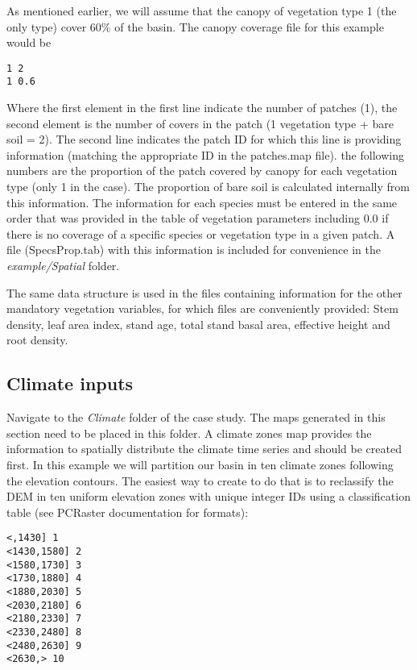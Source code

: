 As mentioned earlier, we will assume that the canopy of vegetation type 1 (the only type) cover 60\% of the basin. The canopy coverage file for this example would be

\begin{verbatim}
1 2
1 0.6
\end{verbatim}

Where the first element in the first line indicate the number of patches (1), the second element is the number of covers in the patch (1 vegetation type + bare soil = 2). The second line indicates the patch ID for which this line is providing information (matching the appropriate ID in the \textsf{patches.map} file). the following numbers are the proportion of the patch covered by canopy for each vegetation type (only 1 in the case). The proportion of bare soil is calculated internally from this information. The information for each species must be entered in the same order that was provided in the table of vegetation parameters including 0.0 if there is no coverage of a specific species or vegetation type in a given patch. A file (\textsf{SpecsProp.tab}) with this information is included for convenience in the \textit{example/Spatial} folder.

The same data structure is used in the files containing information for the other mandatory vegetation variables, for which files are conveniently provided: Stem density, leaf area index, stand age, total stand basal area, effective height and root density.

 
\subsection{Climate inputs} 

Navigate to the \textit{Climate} folder of the case study. The maps generated in this section need to be placed in this folder. A climate zones map provides the information to spatially distribute the climate time series and should be created first. In this example we will partition our basin in ten climate zones following the elevation contours. The easiest way to create to do that is to reclassify the DEM in ten uniform elevation zones with unique integer IDs using a classification table (see PCRaster documentation for formats):

\begin{verbatim}
<,1430] 1
<1430,1580] 2
<1580,1730] 3
<1730,1880] 4
<1880,2030] 5
<2030,2180] 6
<2180,2330] 7
<2330,2480] 8
<2480,2630] 9
<2630,> 10
\end{verbatim}

